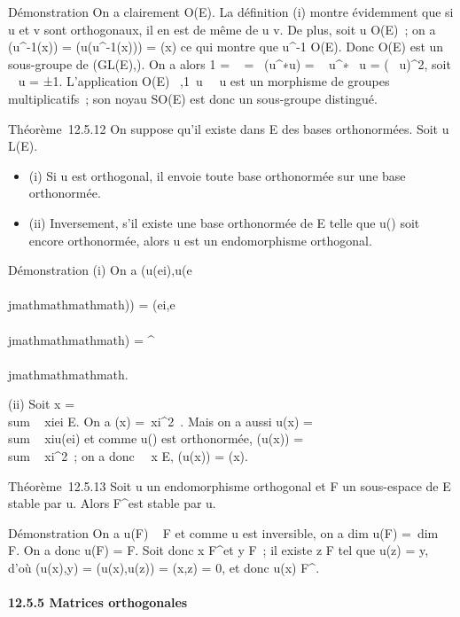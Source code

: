Démonstration On a clairement \mathrmIdE \in
O\Phi(E). La définition (i) montre évidemment que si u et v sont
orthogonaux, il en est de même de u \cdot v. De plus, soit u \in
O\Phi(E)~; on a \Phi(u^-1(x)) = \Phi(u(u^-1(x)))
= \Phi(x) ce qui montre que u^-1 \in O\Phi(E). Donc
O\Phi(E) est un sous-groupe de (GL(E),\cdot). On a alors 1
= ~
\mathrmIdE =\
 (u^∗\cdot u)
= ~
u^∗~ u
= (~
u)^2, soit
\mathrm{det}~ u = ±1.
L'application O\Phi(E) \rightarrow~,1\,
u\mapsto~~
u est un morphisme de groupes multiplicatifs~; son noyau
SO\Phi(E) est donc un sous-groupe distingué.

Théorème~12.5.12 On suppose qu'il existe dans E des bases orthonormées.
Soit u \in L(E).

\begin{itemize}
\itemsep1pt\parskip0pt
\item
  (i) Si u est orthogonal, il envoie toute base orthonormée sur une base
  orthonormée.
\item
  (ii) Inversement, s'il existe une base orthonormée  de E telle que
  u(\mathcal{E}) soit encore orthonormée, alors u est un endomorphisme orthogonal.
\end{itemize}

Démonstration (i) On a \phi(u(ei),u(e\\\\jmathmathmathmath)) =
\phi(ei,e\\\\jmathmathmathmath) = \deltai^\\\\jmathmathmathmath.

(ii) Soit x = \\sum ~
xiei \in E. On a \Phi(x) =\
\sum  xi^2~. Mais on a aussi
u(x) = \\sum ~
xiu(ei) et comme u() est orthonormée, \Phi(u(x))
= \\sum ~
xi^2~; on a donc \forall~~x \in E,
\Phi(u(x)) = \Phi(x).

Théorème~12.5.13 Soit u un endomorphisme orthogonal et F un sous-espace
de E stable par u. Alors F^\bot est stable par u.

Démonstration On a u(F) \subset~ F et comme u est inversible, on a
dim u(F) =\ dim~ F. On
a donc u(F) = F. Soit donc x \in F^\bot et y \in F~; il existe z \in F
tel que u(z) = y, d'où \phi(u(x),y) = \phi(u(x),u(z)) = \phi(x,z) = 0, et donc
u(x) \in F^\bot.

\paragraph{12.5.5 Matrices orthogonales}

